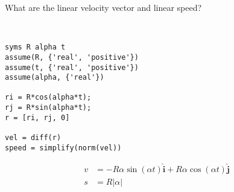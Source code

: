 What are the linear velocity vector and linear speed?

\begin{solution} \
\begin{lstlisting}
syms R alpha t
assume(R, {'real', 'positive'})
assume(t, {'real', 'positive'})
assume(alpha, {'real'})

ri = R*cos(alpha*t);
rj = R*sin(alpha*t);
r = [ri, rj, 0]

vel = diff(r)
speed = simplify(norm(vel))
\end{lstlisting}

\begin{align*}
    v &= -R \alpha \sin(\alpha t) \hat{\boldsymbol{i}} + R \alpha \cos(\alpha t) \hat{\boldsymbol{j}}\\
    s &= R\left|\alpha\right|
\end{align*}
\end{solution}